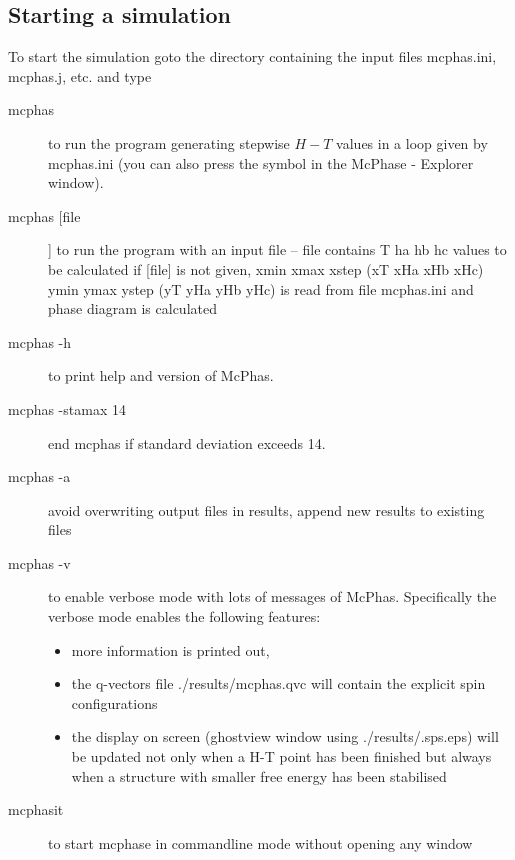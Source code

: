 \subsection{Starting a simulation}
\label{start}

To start the simulation goto the directory containing the
input files {\prg mcphas.ini, mcphas.j, etc. } and type

\begin{description}
\item[\prg mcphas] to run the program generating stepwise $H-T$ values 
              in a loop given by {\prg mcphas.ini} (you can also press the
              symbol in the {\prg McPhase - Explorer} window).
\item[\prg mcphas [file]]  to run the program with an input file --   
             {\prg file} contains T ha hb hc values to be calculated 
             if [file] is not given, xmin xmax xstep (xT xHa xHb xHc)
             ymin ymax ystep (yT yHa yHb yHc) is read from file {\prg mcphas.ini}
	     and phase diagram is calculated
\item[\prg mcphas -h]  to  print help and version of {\prg McPhas}.
\item[\prg mcphas -stamax 14]  end mcphas if standard deviation exceeds 14.
\item[\prg mcphas -a] avoid overwriting output files in results, append new results to existing files
\item[\prg mcphas -v]  to  enable verbose mode with lots of messages of {\prg McPhas}. Specifically
the verbose mode enables the following features:
  \begin{itemize}
			          \item more information is printed out, 
			          \item the q-vectors file {\prg ./results/mcphas.qvc} will contain 
				    the explicit spin configurations
			          \item the display on screen (ghostview window using 
				     {\prg ./results/.sps.eps}) will be updated not only 
				    when a H-T point has been finished but always 
				    when a structure with smaller free energy 
				    has been stabilised
  \end{itemize}
\item[\prg mcphasit] to start mcphase in commandline mode without opening any window
\end{description}

